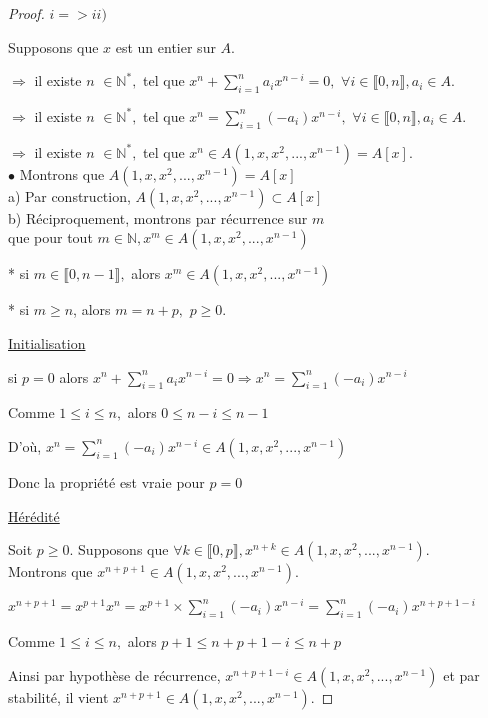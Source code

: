 \begin{proof}
	$i=>ii)$
	
	Supposons que $x$ est un entier sur $A.$
	
	$\Rightarrow $ il existe $n$ $\in \mathbb{N}^{\ast },$ tel que $x^{n}+\sum\limits_{i=1}^{n}a_{i}x^{n-i}=0,$ $\forall i\in \llbracket 0, n \rrbracket ,a_{i}\in A.$
	
	$\Rightarrow $ il existe $n$ $\in \mathbb{N}^{\ast },$ tel que $x^{n}=\sum\limits_{i=1}^{n}(-a_{i})x^{n-i},$ $\forall
	i\in \llbracket 0, n \rrbracket ,a_{i}\in A.$
	
	$\Rightarrow $ il existe $n$ $\in \mathbb{N}^{\ast },$ tel que $x^{n}\in A(1,x,x^{2},...,x^{n-1})=A[x].$\\
	$\bullet$ Montrons que $A(1,x,x^{2},...,x^{n-1})=A[x]$\\
	a) Par construction, $A(1,x,x^{2},...,x^{n-1})\subset A[x]$\\
	b) Réciproquement, montrons par récurrence sur $m$\\ que pour tout $m	\in \mathbb{N},x^{m}\in A(1,x,x^{2},...,x^{n-1})$
	
	* si $m\in \llbracket 0, n-1 \rrbracket ,$ alors $x^{m}\in
	A(1,x,x^{2},...,x^{n-1})$
	
	* si $m\geq n$, alors $m=n+p,$ $p\geq 0.$
	
	\underline{Initialisation}
	
	si $p=0$ alors  $x^{n}+\sum\limits_{i=1}^{n}a_{i}x^{n-i}=0\Rightarrow
	x^{n}=\sum\limits_{i=1}^{n}(-a_{i})x^{n-i}$
	
	Comme $1\leq i\leq n,$ alors $0\leq n-i\leq n-1$
	
	D'où, $x^{n}=\sum\limits_{i=1}^{n}(-a_{i})x^{n-i}\in
	A(1,x,x^{2},...,x^{n-1})$
	
	Donc la propriété est vraie pour $p=0$
	
	\underline{Hérédité}
	
	Soit $p\geq 0.$ Supposons que $\forall k\in \llbracket 0, p \rrbracket
	,x^{n+k}\in A(1,x,x^{2},...,x^{n-1})$.\\ Montrons que $x^{n+p+1}\in
	A(1,x,x^{2},...,x^{n-1}).$
	
	$x^{n+p+1}=x^{p+1}x^{n}=x^{p+1}\times
	\sum\limits_{i=1}^{n}(-a_{i})x^{n-i}=\sum%
	\limits_{i=1}^{n}(-a_{i})x^{n+p+1-i}$
	
	Comme $1\leq i\leq n,$ alors $p+1\leq n+p+1-i\leq n+p$
	
	Ainsi par hypothèse de récurrence, $x^{n+p+1-i}\in
	A(1,x,x^{2},...,x^{n-1})$ et par stabilité, il vient $x^{n+p+1}\in
	A(1,x,x^{2},...,x^{n-1}).$
	

\end{proof}
